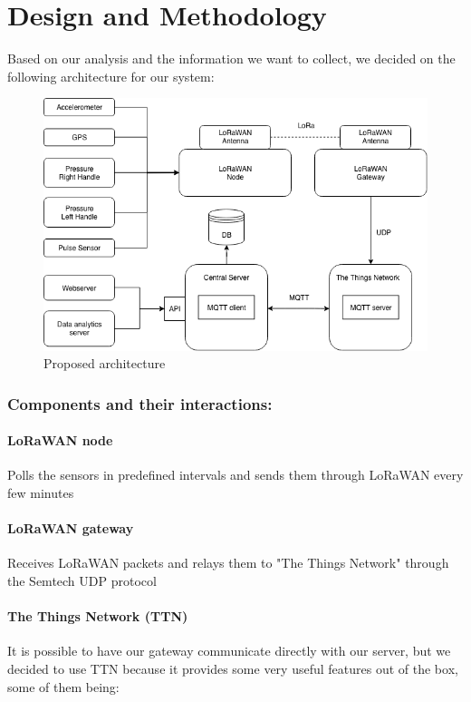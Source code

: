 \chapter{Design and Methodology}
\label{cha:design-and-method}

Based on our analysis and the information we want to collect, we decided on the following architecture for our system:

\begin{figure}[h]
\centering
\includegraphics[width=1\linewidth]{gfx/architecture}
\caption{Proposed architecture}
\label{fig:image1}
\end{figure}

\subsection{Components and their interactions: }


\subsubsection{LoRaWAN node}
Polls the sensors in predefined intervals and sends them through LoRaWAN every few minutes

\subsubsection{LoRaWAN gateway}
Receives LoRaWAN packets and relays them to "The Things Network" through the Semtech UDP protocol

\subsubsection{The Things Network (TTN)}
It is possible to have our gateway communicate directly with our server, but we decided to use TTN because it provides some very useful features out of the box, some of them being:

